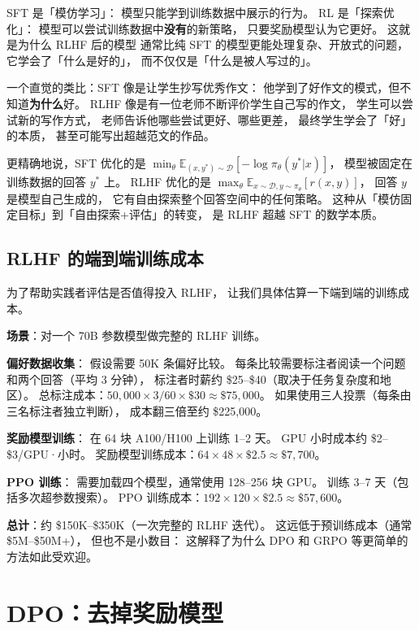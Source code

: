 \begin{whybox}
SFT 是「模仿学习」：
模型只能学到训练数据中展示的行为。
RL 是「探索优化」：
模型可以尝试训练数据中\textbf{没有}的新策略，
只要奖励模型认为它更好。
这就是为什么 RLHF 后的模型
通常比纯 SFT 的模型更能处理复杂、开放式的问题，
它学会了「什么是好的」，
而不仅仅是「什么是被人写过的」。

一个直觉的类比：SFT 像是让学生抄写优秀作文：
他学到了好作文的模式，但不知道\textbf{为什么}好。
RLHF 像是有一位老师不断评价学生自己写的作文，
学生可以尝试新的写作方式，
老师告诉他哪些尝试更好、哪些更差，
最终学生学会了「好」的本质，
甚至可能写出超越范文的作品。

更精确地说，SFT 优化的是
$\min_\theta \mathbb{E}_{(x,y^*) \sim \mathcal{D}}[-\log \pi_\theta(y^*|x)]$，
模型被固定在训练数据的回答 $y^*$ 上。
RLHF 优化的是
$\max_\theta \mathbb{E}_{x \sim \mathcal{D}, y \sim \pi_\theta}[r(x,y)]$，
回答 $y$ 是模型自己生成的，
它有自由探索整个回答空间中的任何策略。
这种从「模仿固定目标」到「自由探索+评估」的转变，
是 RLHF 超越 SFT 的数学本质。
\end{whybox}

\subsection{RLHF 的端到端训练成本}

为了帮助实践者评估是否值得投入 RLHF，
让我们具体估算一下端到端的训练成本。

\textbf{场景}：对一个 70B 参数模型做完整的 RLHF 训练。

\textbf{偏好数据收集}：
假设需要 50K 条偏好比较。
每条比较需要标注者阅读一个问题和两个回答（平均 3 分钟），
标注者时薪约 \$25--\$40（取决于任务复杂度和地区）。
总标注成本：$50{,}000 \times 3/60 \times \$30 \approx \$75{,}000$。
如果使用三人投票（每条由三名标注者独立判断），
成本翻三倍至约 \$225,000。

\textbf{奖励模型训练}：
在 64 块 A100/H100 上训练 1--2 天。
GPU 小时成本约 \$2--\$3/GPU·小时。
奖励模型训练成本：$64 \times 48 \times \$2.5 \approx \$7{,}700$。

\textbf{PPO 训练}：
需要加载四个模型，通常使用 128--256 块 GPU。
训练 3--7 天（包括多次超参数搜索）。
PPO 训练成本：$192 \times 120 \times \$2.5 \approx \$57{,}600$。

\textbf{总计}：约 \$150K--\$350K（一次完整的 RLHF 迭代）。
这远低于预训练成本（通常 \$5M--\$50M+），
但也不是小数目：
这解释了为什么 DPO 和 GRPO 等更简单的方法如此受欢迎。

\section{DPO：去掉奖励模型}

